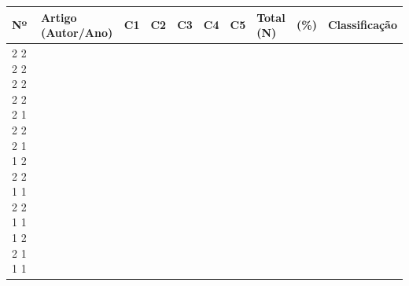 \begin{table}[H]
\centering
\setlength{\tabcolsep}{2pt}
\renewcommand{\arraystretch}{1.1}
\begin{tabularx}{0.94\textwidth}
{|C{0.6cm}
  |P{4.5cm}
  |C{0.75cm}
  |C{0.75cm}
  |C{0.75cm}
  |C{0.75cm}
  |C{0.75cm}
  |C{1.1cm}
  |C{0.8cm}
  |Y|}
\hline
\textbf{Nº}
& \textbf{Artigo (Autor/Ano)}
& \textbf{C1}   & \textbf{C2}
& \textbf{C3}   & \textbf{C4}
& \textbf{C5}   & \textbf{Total (N)}
& \textbf{(\%)} & \textbf{Classificação} \\
\hline
\setcounter{artigoAvaliado}{0}
{2}
{2}
{2}
{2}
{2}%
{2}
{2}
{2}
{2}
{1}%
{2}
{2}
{2}
{1}
{1}%
{2}
{2}
{2}
{1}
{1}%
{2}
{2}
{1}
{1}
{1}%
{2}
{2}
{1}
{1}
{1}%


\end{tabularx}
\end{table}

\newpage



